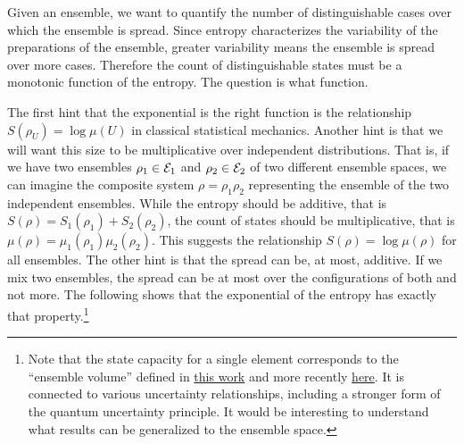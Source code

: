Given an ensemble, we want to quantify the number of distinguishable cases over which the ensemble is spread. Since entropy characterizes the variability of the preparations of the ensemble, greater variability means the ensemble is spread over more cases. Therefore the count of distinguishable states must be a monotonic function of the entropy. The question is what function.

The first hint that the exponential is the right function is the relationship $S(\rho_U) = \log \mu(U)$ in classical statistical mechanics. Another hint is that we will want this size to be multiplicative over independent distributions. That is, if we have two ensembles $\rho_1 \in \mathcal{E}_1$ and $\rho_2 \in \mathcal{E}_2$ of two different ensemble spaces, we can imagine the composite system $\rho = \rho_1 \rho_2$ representing the ensemble of the two independent ensembles. While the entropy should be additive, that is $S(\rho) = S_1(\rho_1) + S_2(\rho_2)$, the count of states should be multiplicative, that is $\mu(\rho) = \mu_1(\rho_1) \mu_2(\rho_2)$. This suggests the relationship $S(\rho) = \log \mu (\rho)$ for all ensembles. The other hint is that the spread can be, at most, additive. If we mix two ensembles, the spread can be at most over the configurations of both and not more. The following shows that the exponential of the entropy has exactly that property.\footnote{
	Note that the state capacity for a single element corresponds to the ``ensemble volume'' defined in \href{https://arxiv.org/pdf/physics/9903045}{this work} and more recently \href{https://arxiv.org/pdf/1804.01343}{here}. It is connected to various uncertainty relationships, including a stronger form of the quantum uncertainty principle. It would be interesting to understand what results can be generalized to the ensemble space.}

